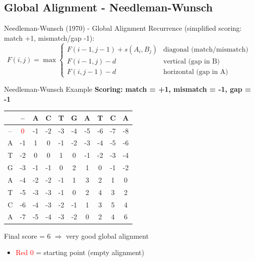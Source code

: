 \documentclass[
11pt, %
aspectratio=169, %
]{beamer}
\begin{document}

\subsection{Global Alignment - Needleman-Wunsch}
\begin{frame}{Needleman-Wunsch (1970) - Global Alignment}
Recurrence (simplified scoring: match +1, mismatch/gap -1):
\[
F(i,j)=\max\begin{cases}
F(i-1,j-1) + s(A_i,B_j) & \text{diagonal (match/mismatch)}\\
F(i-1,j) - d         & \text{vertical (gap in B)}\\
F(i,j-1) - d         & \text{horizontal (gap in A)}
\end{cases}
\]
\end{frame}


\begin{frame}{Needleman-Wunsch Example}
\centering
\bfseries Scoring: match = +1, \quad mismatch = -1, \quad gap = -1

\bigskip
\begin{table}
\centering
\small
\begin{tabular}{c||c|cccccccc}
     & -- & A     & C     & T     & G     & A     & T     & C     & A \\
\hline
--   & \textcolor{red}{0} & -1 & -2 & -3 & -4 & -5 & -6 & -7 & -8 \\
A    & -1 & \alert{1} & \alert{0}  & -1 & -2 & -3 & -4 & -5 & -6 \\
T    & -2 & 0  & 0  & \alert{1} & 0  & -1 & -2 & -3 & -4 \\
G    & -3 & -1 & -1 & 0  & \alert{2} & 1  & 0  & -1 & -2 \\
A    & -4 & -2 & -2 & -1 & 1  & \alert{3} & 2  & 1  & 0  \\
T    & -5 & -3 & -3 & -1 & 0  & 2  & \alert{4} & 3  & 2  \\
C    & -6 & -4 & -3 & -2 & -1 & 1  & 3  & \alert{5} & 4  \\
A    & -7 & -5 & -4 & -3 & -2 & 0  & 2  & 4  & \alert{6} \\
\end{tabular}
\end{table}

\bigskip
\alert{Final score = 6} $\Rightarrow$ very good global alignment

\bigskip
\footnotesize
\begin{itemize}
\item \textcolor{red}{Red 0} = starting point (empty alignment)
\end{itemize}
\end{frame}
\end{document}
